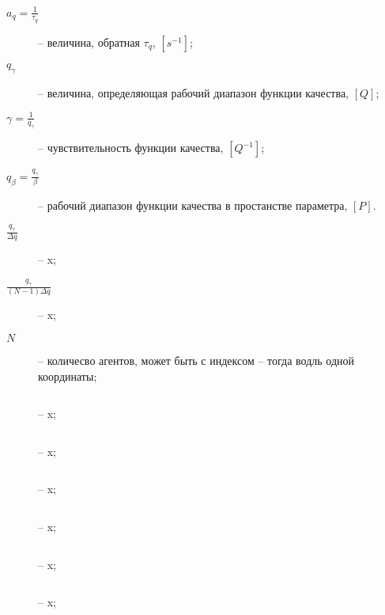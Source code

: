 \begin{description}
  \item[$a_q = \frac{1}{\tau_q} $]  -- величина, обратная $\tau_q$, $[s^{-1}]$;

  \item[$q_\gamma $]  -- величина, определяющая рабочий диапазон функции качества, $[Q]$;

  \item[$\gamma = \frac{1}{q_\gamma} $]  -- чувствительность функции качества, $[Q^{-1}]$;

  \item[$q_\beta = \frac{q_\gamma}{\beta} $]  -- рабочий диапазон функции качества в простанстве параметра, $[P]$.

  \item[$\frac{q_\gamma}{\Delta q} $]  -- x;

  \item[$\frac{q_\gamma}{(N-1)\Delta q} $]  -- x;

  \item[$N$]  -- количесво агентов, может быть с индексом -- тогда водль одной координаты;

  \item[$ $]  -- x;

  \item[$ $]  -- x;

  \item[$ $]  -- x;

  \item[$ $]  -- x;

  \item[$ $]  -- x;

  \item[$ $]  -- x;


\end{description}




